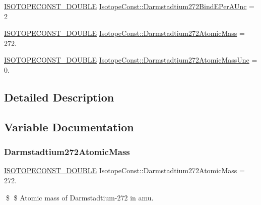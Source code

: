\begin{DoxyCompactItemize}
\item 
\mbox{\hyperlink{group___isotope_const-_macros_ga8f45a7272ce02c0b4c65c44636ed719a}{I\+S\+O\+T\+O\+P\+E\+C\+O\+N\+S\+T\+\_\+\+D\+O\+U\+B\+LE}} \mbox{\hyperlink{group___isotope_const-_darmstadtium-_ds272_ga7d4ff1fbf2c26b4add72c6b1ab799ae0}{Isotope\+Const\+::\+Darmstadtium272\+Bind\+E\+Per\+A\+Unc}} = 2
\item 
\mbox{\hyperlink{group___isotope_const-_macros_ga8f45a7272ce02c0b4c65c44636ed719a}{I\+S\+O\+T\+O\+P\+E\+C\+O\+N\+S\+T\+\_\+\+D\+O\+U\+B\+LE}} \mbox{\hyperlink{group___isotope_const-_darmstadtium-_ds272_gacaf91499ee44f34058be37903e37da99}{Isotope\+Const\+::\+Darmstadtium272\+Atomic\+Mass}} = 272.
\item 
\mbox{\hyperlink{group___isotope_const-_macros_ga8f45a7272ce02c0b4c65c44636ed719a}{I\+S\+O\+T\+O\+P\+E\+C\+O\+N\+S\+T\+\_\+\+D\+O\+U\+B\+LE}} \mbox{\hyperlink{group___isotope_const-_darmstadtium-_ds272_ga6a35e7c029459b4d452168953258f8c3}{Isotope\+Const\+::\+Darmstadtium272\+Atomic\+Mass\+Unc}} = 0.
\end{DoxyCompactItemize}


\subsection{Detailed Description}


\subsection{Variable Documentation}
\mbox{\label{group___isotope_const-_darmstadtium-_ds272_gacaf91499ee44f34058be37903e37da99}} 
\subsubsection{\texorpdfstring{Darmstadtium272\+Atomic\+Mass}{Darmstadtium272AtomicMass}}
{\footnotesize\ttfamily \mbox{\hyperlink{group___isotope_const-_macros_ga8f45a7272ce02c0b4c65c44636ed719a}{I\+S\+O\+T\+O\+P\+E\+C\+O\+N\+S\+T\+\_\+\+D\+O\+U\+B\+LE}} Isotope\+Const\+::\+Darmstadtium272\+Atomic\+Mass = 272.}

\$ \$ Atomic mass of Darmstadtium-\/272 in amu. \mbox{\label{group___isotope_const-_darmstadtium-_ds272_ga6a35e7c029459b4d452168953258f8c3}} 
